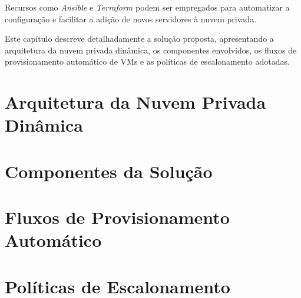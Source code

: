 Recursos como \textit{Ansible} e \textit{Terraform} podem ser empregados para automatizar a configuração e facilitar a adição de novos servidores à nuvem privada.


Este capítulo descreve detalhadamente a solução proposta, apresentando a arquitetura da nuvem privada dinâmica, os componentes envolvidos, os fluxos de provisionamento automático de VMs e as políticas de escalonamento adotadas.

\section{Arquitetura da Nuvem Privada Dinâmica}

\section{Componentes da Solução}

\section{Fluxos de Provisionamento Automático}

\section{Políticas de Escalonamento}
